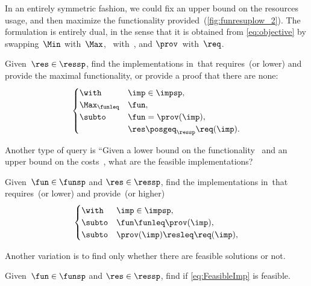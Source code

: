 In an entirely symmetric fashion, we could fix an upper bound on
the resources usage, and then maximize the functionality provided~(\cref{fig:funresuplow_2}).
The formulation is entirely dual, in the sense that it is obtained
from \cref{eq:objective} by swapping~$\Min$ with~$\Max$, \funsp~with~\ressp,
and $\prov$~with~$\req$.

\begin{problem}[\FixResMaxFun]
    \label{prob:FixResMaxFun}
    Given~$\res\in\ressp$, find the implementations
    in~\impsp that requires~\res (or lower)
    and provide the maximal functionality, or provide a proof that there are none:
    \begin{equation}
        \begin{cases}
            \with & \imp\in\impsp,\\
            \Max_{\funleq} & \fun,\\
            \subto & \fun=\prov(\imp),\\
            & \res\posgeq_{\ressp}\req(\imp).
        \end{cases}\label{eq:objective-1}
    \end{equation}
\end{problem}


\vspace{1cm}


Another type of query is
``Given a lower bound on the functionality~\fun
and an upper bound on the costs~\fun, what are the feasible implementations?


\begin{problem}[\FeasibleImp]
    \label{prob:FeasibleImp}
    Given~$\fun\in\funsp$ and $\res\in\ressp$, find the implementations
    in~\impsp that requires~\res (or lower)
    and provide~\fun (or higher)
    \begin{equation}
        \label{eq:FeasibleImp}
        \begin{cases}
            \with & \imp\in\impsp,\\
            \subto & \fun \funleq \prov(\imp),\\
            \subto &  \prov(\imp) \resleq \req(\imp) ,\\
        \end{cases}
    \end{equation}
\end{problem}

Another variation is to find only whether there are feasible solutions or not.

\begin{problem}[\Feasibility]
    \label{prob:Feasibility}
    Given~$\fun\in\funsp$ and $\res\in\ressp$, find if \cref{eq:FeasibleImp} is feasible.
\end{problem}
